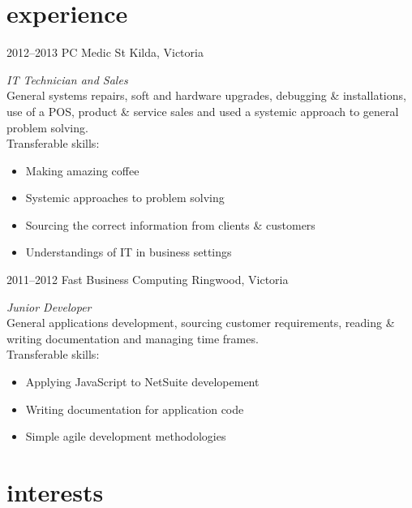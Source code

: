 \documentclass[]{friggeri-cv} %
\begin{document}
\section{experience}

\begin{entrylist}
\entry
{2012--2013}
{PC Medic}
{St Kilda, Victoria}
{\emph{IT Technician and Sales} \\
General systems repairs, soft and hardware upgrades, debugging \& installations, use of a POS, product \& service sales and used a systemic approach to general problem solving. \\
Transferable skills:
\begin{itemize}
    \item Making amazing coffee
    \item Systemic approaches to problem solving
    \item Sourcing the correct information from clients \& customers
    \item Understandings of IT in business settings
\end{itemize}
}
\entry
{2011--2012}
{Fast Business Computing}
{Ringwood, Victoria}
{\emph{Junior Developer} \\
General applications development, sourcing customer requirements, reading \& writing documentation and managing time frames. \\
Transferable skills:
\begin{itemize}
    \item Applying JavaScript to NetSuite developement
    \item Writing documentation for application code
    \item Simple agile development methodologies
\end{itemize}
}
\end{entrylist}

\section{interests}
\end{document}
